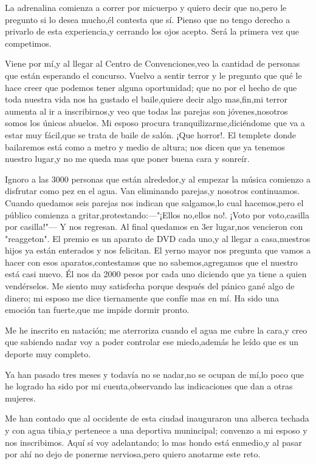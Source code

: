 \documentclass[letterpaper,12pt]{book}
\begin{document}
La adrenalina comienza a correr por micuerpo y quiero decir que no,pero le pregunto si lo desea mucho,él contesta que sí. Pienso que no tengo derecho a privarlo de esta experiencia,y cerrando los ojos acepto. Será la primera vez que competimos.

Viene por mí,y al llegar al Centro de Convenciones,veo la cantidad de personas que están esperando el concurso. Vuelvo a sentir terror y le pregunto que qué le hace creer que podemos tener alguna oportunidad; que no por el hecho de que toda nuestra vida nos ha gustado el baile,quiere decir algo mas,fin,mi terror aumenta al ir a inscribirnos,y veo que todas las parejas son jóvenes,nosotros somos los únicos abuelos. Mi esposo procura tranquilizarme,diciéndome que va a estar muy fácil,que se trata de baile de salón. ¡Que horror!. El templete donde bailaremos está como a metro y medio de altura; nos dicen que ya tenemos nuestro lugar,y no me queda mas que poner buena cara y sonreír. 

Ignoro a las 3000 personas que están alrededor,y al empezar la música comienzo a disfrutar como pez en el agua. Van eliminando parejas,y nosotros continuamos. Cuando quedamos seis parejas nos indican que salgamos,lo cual hacemos,pero el público comienza a gritar,protestando:---"¡Ellos no,ellos no!. ¡Voto por voto,casilla por casilla!"--- Y nos regresan. Al final quedamos en 3er lugar,nos vencieron con "reaggeton". El premio es un aparato de DVD cada uno,y al llegar a casa,nuestros hijos ya están enterados y nos felicitan. El yerno mayor nos pregunta que vamos a hacer con esos aparatos,contestamos que no sabemos,agregamos que el nuestro está casi nuevo. Él nos da 2000 pesos por cada uno diciendo que ya tiene a quien vendérselos. Me siento muy satisfecha porque después del pánico gané algo de dinero; mi esposo me dice tiernamente que confíe mas en mí. Ha sido una emoción tan fuerte,que me impide dormir pronto.

Me he inscrito en natación; me aterroriza cuando el agua me cubre la cara,y creo que sabiendo nadar voy a poder controlar ese miedo,además he leído que es un deporte muy completo.

Ya han pasado tres meses y todavía no se nadar,no se ocupan de mí,lo poco que he logrado ha sido por mi cuenta,observando las indicaciones que dan a otras mujeres.

Me han contado que al occidente de esta ciudad inauguraron una alberca techada y con agua tibia,y pertenece a una deportiva munincipal; convenzo a mi esposo y nos inscribimos. Aquí sí voy adelantando; lo mas hondo está enmedio,y al pasar por ahí no dejo de ponerme nerviosa,pero quiero anotarme este reto.
\end{document}
